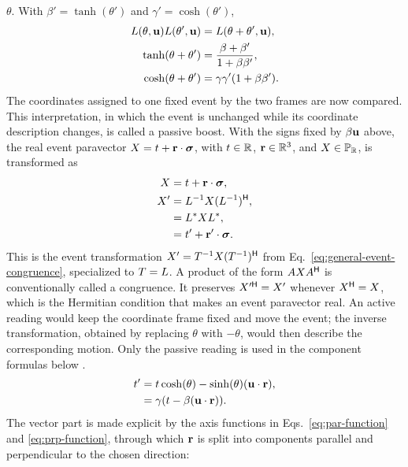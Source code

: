 \(\theta\). With \(\beta'=\tanh(\theta')\) and
\(\gamma'=\cosh(\theta')\),
\begin{align*}
L(\theta,\mathbf{u})L(\theta',\mathbf{u})
&=L(\theta+\theta',\mathbf{u}),\\
\tanh(\theta+\theta')&=\frac{\beta+\beta'}{1+\beta\beta'},\\
\cosh(\theta+\theta')&=\gamma\gamma'(1+\beta\beta').
\end{align*}
The coordinates assigned to one fixed event by the two frames are now
compared. This interpretation, in which the event is unchanged while its
coordinate description changes, is called a passive boost. With the signs
fixed by \(\beta\mathbf{u}\) above, the real event paravector
\(X=t+\mathbf{r}\cdot\mathbf{\bm{\sigma}}\), with \(t\in\mathbb{R}\),
\(\mathbf{r}\in\mathbb{R}^3\), and \(X\in\mathbb{P}_{\mathbb{R}}\), is transformed as
\begin{align*}
X &= t + \mathbf{r} \cdot \mathbf{\bm{\sigma}},\notag \\
X' &= L^{-1}X(L^{-1})^{\mathsf H},\notag\\
&=L^{*} X L^{*},\notag \\
&= t' + \mathbf{r}' \cdot \mathbf{\bm{\sigma}}.
\end{align*}
This is the event transformation
\(X'=T^{-1}X(T^{-1})^{\mathsf H}\) from
Eq.\ \eqref{eq:general-event-congruence}, specialized to
\(T=L\). A product of the form
\(AXA^{\mathsf H}\) is conventionally called a congruence.
It preserves
\(X'^{\mathsf H}=X'\) whenever
\(X^{\mathsf H}=X\), which is the Hermitian condition that makes an
event paravector real.
An active reading would keep the coordinate frame fixed and move the event;
the inverse transformation, obtained by replacing \(\theta\) with
\(-\theta\), would then describe the corresponding motion. Only the passive
reading is used in the component formulas below
\cite{einstein1905,baylis1999}.
\begin{align*}
t' &= t \cosh(\theta ) - \sinh(\theta ) (\mathbf{u} \cdot \mathbf{r}),\notag \\
&= \gamma ( t - \beta (\mathbf{u} \cdot \mathbf{r}) ).
\end{align*}
The vector part is made explicit by the axis functions in
Eqs.\ \eqref{eq:par-function} and \eqref{eq:prp-function}, through which
\(\mathbf{r}\) is split into
components parallel and perpendicular to the chosen direction:
